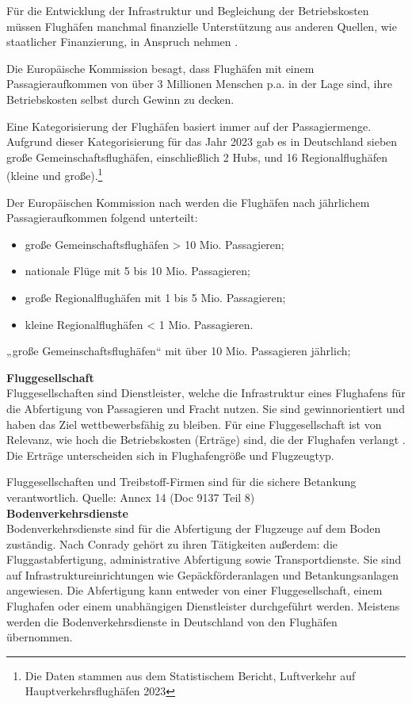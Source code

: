 Für die Entwicklung der Infrastruktur und Begleichung der Betriebskosten müssen Flughäfen manchmal finanzielle Unterstützung aus anderen
Quellen, wie staatlicher Finanzierung, in Anspruch nehmen \cite{schaar2010analysis}.

Die Europäische Kommission besagt, dass Flughäfen mit einem Passagieraufkommen von über 3 Millionen 
Menschen p.a. in der Lage sind, ihre Betriebskosten selbst durch Gewinn zu decken. %

Eine Kategorisierung der Flughäfen basiert immer auf der Passagiermenge. Aufgrund dieser Kategorisierung für das Jahr 2023 gab es in Deutschland 
sieben große Gemeinschaftsflughäfen, einschließlich 2 Hubs, und 16 Regionalflughäfen (kleine und große).\footnote{Die Daten stammen aus dem Statistischem Bericht, Luftverkehr auf Hauptverkehrsflughäfen 2023} %

Der Europäischen Kommission nach werden die Flughäfen nach jährlichem Passagieraufkommen folgend unterteilt: 
\begin{itemize}
    \item große Gemeinschaftsflughäfen > 10 Mio. Passagieren;
    \item nationale Flüge mit 5 bis 10 Mio. Passagieren;
    \item große Regionalflughäfen mit 1 bis 5 Mio. Passagieren;
    \item kleine Regionalflughäfen < 1 Mio. Passagieren.
\end{itemize}

„große Gemeinschaftsflughäfen“ mit über 10 Mio. Passagieren jährlich; 

\textbf{Fluggesellschaft} \\
Fluggesellschaften sind Dienstleister, welche die Infrastruktur eines Flughafens für die Abfertigung von Passagieren und Fracht nutzen. 
Sie sind gewinnorientiert und haben das Ziel wettbewerbsfähig zu bleiben. 
Für eine Fluggesellschaft ist von Relevanz, wie hoch die Betriebskosten (Erträge)
sind, die der Flughafen verlangt \cite{schaar2010analysis}. Die Erträge unterscheiden sich in Flughafengröße und Flugzeugtyp.

Fluggesellschaften und Treibstoff-Firmen sind für die sichere Betankung verantwortlich. Quelle: Annex 14 (Doc 9137 Teil 8)
\\
\textbf{Bodenverkehrsdienste} \\ %
Bodenverkehrsdienste sind für die Abfertigung der Flugzeuge auf dem Boden zuständig. 
Nach Conrady \cite{conrady2019luftverkehr} gehört zu ihren Tätigkeiten außerdem:  
die Fluggastabfertigung, administrative Abfertigung sowie Transportdienste.
Sie sind auf Infrastruktureinrichtungen wie Gepäckförderanlagen und Betankungsanlagen angewiesen. 
Die Abfertigung kann entweder von einer Fluggesellschaft, einem Flughafen oder einem unabhängigen Dienstleister durchgeführt werden. 
Meistens werden die Bodenverkehrsdienste in Deutschland von den Flughäfen übernommen. \\ %


